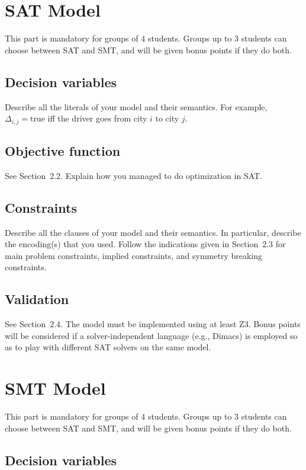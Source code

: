 \documentclass{article}
\begin{document}
\section{SAT Model}

This part is mandatory for groups of 4 students. Groups up to 3 students can choose between SAT and SMT, and will be given bonus points if they do both.

\subsection{Decision variables}

Describe all the literals of your model and their semantics. For example, $\Delta_{i,j} = \text{true}$ iff the driver goes from city $i$ to city $j$.

\subsection{Objective function}

See Section~2.2. Explain how you managed to do optimization in SAT.

\subsection{Constraints}

Describe all the clauses of your model and their semantics. In particular, describe the encoding(s) that you used. Follow the indications given in Section~2.3 for main problem constraints, implied constraints, and symmetry breaking constraints.

\subsection{Validation}

See Section~2.4. The model must be implemented using at least Z3. Bonus points will be considered if a solver-independent language (e.g., Dimacs) is employed so as to play with different SAT solvers on the same model.

\section{SMT Model}

This part is mandatory for groups of 4 students. Groups up to 3 students can choose between SAT and SMT, and will be given bonus points if they do both.

\subsection{Decision variables}
\end{document}
